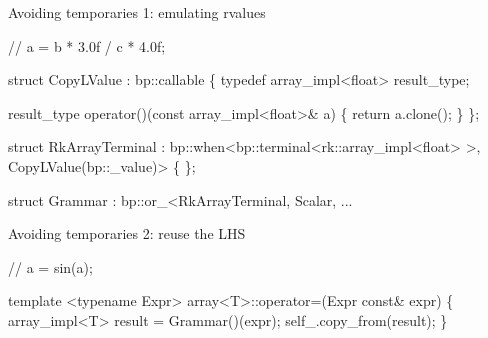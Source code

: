 % 
% 

% 
% 
% 
% 
% 

\begin{frame}[fragile]{Avoiding temporaries 1: emulating rvalues}
\begin{semiverbatim}
// \alert<2>{a = \alert<4>{\alert<3>{b} * 3.0f} / \alert<4>{\alert<3>{c} * 4.0f;}}

struct \alert<5>{CopyLValue} : bp::callable
\{
  typedef array_impl<float> result_type;
  
  result_type
  operator()(const array_impl<float>& a)
  \{
\alert<6>{    return a.clone();}
  \}
\};

struct RkArrayTerminal 
  : bp::when<bp::terminal<rk::array_impl<float> >, 
             \alert<5>{CopyLValue(bp::_value)}>
\{ \};

struct Grammar : bp::or_<RkArrayTerminal, Scalar, ...
\end{semiverbatim}
\note{ }
\end{frame}


\begin{frame}[fragile]{Avoiding temporaries 2: reuse the LHS}
\begin{semiverbatim}
// \alert<2>{a = sin(a);}

template <typename Expr>
array<T>::operator=(Expr const& expr)
\{
  array_impl<T> result = Grammar()(expr);
  self_.copy_from(result);
\}

\end{semiverbatim}
\end{frame}

